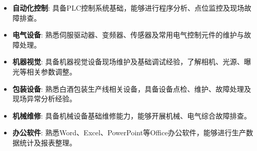 \documentclass{resume}
\begin{document}
\begin{itemize}[parsep=0.2ex]
  \item \textbf{自动化控制}: 具备PLC控制系统基础，能够进行程序分析、点位监控及现场故障排查。
  \item \textbf{电气设备}: 熟悉伺服驱动器、变频器、传感器及常用电气控制元件的维护与故障处理。
  \item \textbf{机器视觉}: 具备机器视觉设备现场维护及基础调试经验，了解相机、光源、曝光等相关参数调整。
  \item \textbf{包装设备}: 熟悉白酒包装生产线相关设备，具备设备点检、维护、故障处理及现场异常分析经验。
  \item \textbf{机械维修}: 具备机械设备基础维修能力，能够开展机械、电气综合故障排查。
  \item \textbf{办公软件}: 熟悉Word、Excel、PowerPoint等Office办公软件，能够进行生产数据统计及报表整理。
\end{itemize}




%
%
\end{document}
